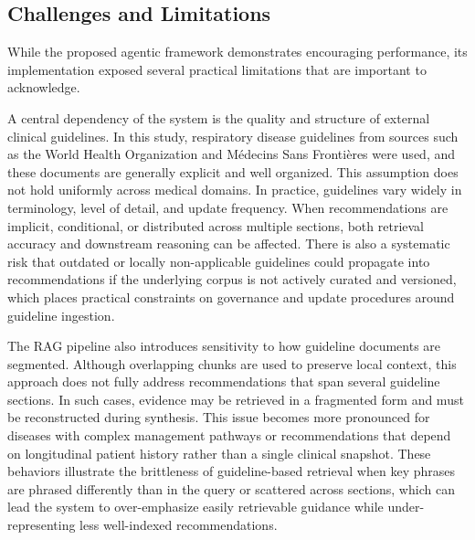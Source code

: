 \documentclass[preprint,12pt]{elsarticle}
\begin{document}
\subsection[]{Challenges and Limitations}
\label{subsec:limitations}

While the proposed agentic framework demonstrates encouraging performance, its implementation exposed several practical limitations that are important to acknowledge.

A central dependency of the system is the quality and structure of external clinical guidelines. In this study, respiratory disease guidelines from sources such as the World Health Organization and M\'edecins Sans Fronti\`eres were used, and these documents are generally explicit and well organized. This assumption does not hold uniformly across medical domains. In practice, guidelines vary widely in terminology, level of detail, and update frequency. When recommendations are implicit, conditional, or distributed across multiple sections, both retrieval accuracy and downstream reasoning can be affected. There is also a systematic risk that outdated or locally non-applicable guidelines could propagate into recommendations if the underlying corpus is not actively curated and versioned, which places practical constraints on governance and update procedures around guideline ingestion.

The RAG pipeline also introduces sensitivity to how guideline documents are segmented. Although overlapping chunks are used to preserve local context, this approach does not fully address recommendations that span several guideline sections. In such cases, evidence may be retrieved in a fragmented form and must be reconstructed during synthesis. This issue becomes more pronounced for diseases with complex management pathways or recommendations that depend on longitudinal patient history rather than a single clinical snapshot. These behaviors illustrate the brittleness of guideline-based retrieval when key phrases are phrased differently than in the query or scattered across sections, which can lead the system to over-emphasize easily retrievable guidance while under-representing less well-indexed recommendations.
\end{document}
